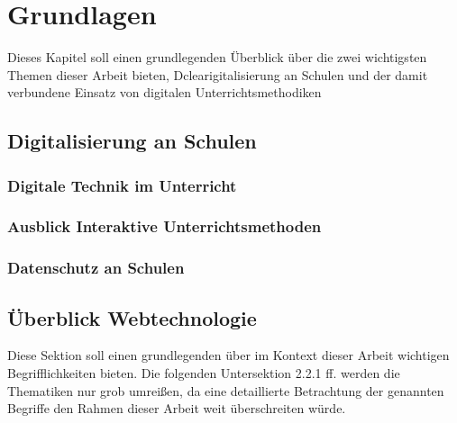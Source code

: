 \section{Grundlagen}\label{sec:grundlagen}
Dieses Kapitel soll einen grundlegenden Überblick über die zwei wichtigsten Themen dieser Arbeit bieten, Dclearigitalisierung an Schulen und der damit verbundene Einsatz von digitalen Unterrichtsmethodiken
\subsection{Digitalisierung an Schulen}
\subsubsection{Digitale Technik im Unterricht}\label{sec:technikunterricht}
\subsubsection{Ausblick Interaktive Unterrichtsmethoden}\label{sec:interaktiveunterr}
\subsubsection{Datenschutz an Schulen}\label{sec:datenschutz}

\subsection{Überblick Webtechnologie}\label{sec:webbasedsoftware}
Diese Sektion soll einen grundlegenden über im Kontext dieser Arbeit wichtigen Begrifflichkeiten bieten. Die folgenden Untersektion 2.2.1 ff. werden die Thematiken nur grob umreißen, da eine detaillierte Betrachtung der genannten Begriffe den Rahmen dieser Arbeit weit überschreiten würde. 

